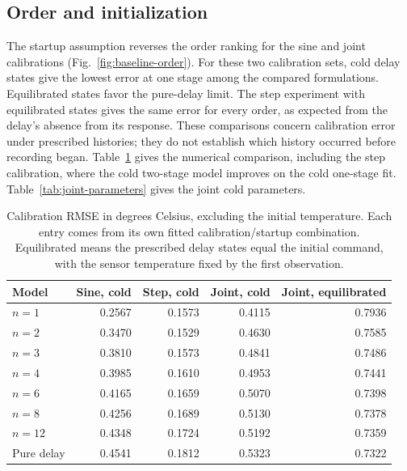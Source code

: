 \documentclass[11pt]{article}
\begin{document}
\subsection{Order and initialization}
The startup assumption reverses the order ranking for the sine and joint
calibrations (Fig.~\ref{fig:baseline-order}). For these two calibration sets,
cold delay states give the lowest error at one stage among the compared
formulations. Equilibrated states favor
the pure-delay limit. The step experiment with equilibrated states gives the
same error for every order, as expected from the delay's absence from its
response. These comparisons concern calibration error under prescribed histories;
they do not establish which history occurred before recording began.
Table~\ref{tab:calibration-rmse} gives the numerical comparison, including the
step calibration, where the cold two-stage model improves on the cold one-stage
fit. Table~\ref{tab:joint-parameters} gives the joint cold parameters.

\begin{table}[tbp]
\centering
\small
\begin{tabular}{lrrrr}
\toprule
Model & Sine, cold & Step, cold & Joint, cold & Joint, equilibrated \\
\midrule
$n=1$ & 0.2567 & 0.1573 & 0.4115 & 0.7936 \\
$n=2$ & 0.3470 & 0.1529 & 0.4630 & 0.7585 \\
$n=3$ & 0.3810 & 0.1573 & 0.4841 & 0.7486 \\
$n=4$ & 0.3985 & 0.1610 & 0.4953 & 0.7441 \\
$n=6$ & 0.4165 & 0.1659 & 0.5070 & 0.7398 \\
$n=8$ & 0.4256 & 0.1689 & 0.5130 & 0.7378 \\
$n=12$ & 0.4348 & 0.1724 & 0.5192 & 0.7359 \\
Pure delay & 0.4541 & 0.1812 & 0.5323 & 0.7322 \\
\bottomrule
\end{tabular}
\caption{Calibration RMSE in degrees Celsius, excluding the initial temperature. Each entry comes from its own fitted calibration/startup combination. Equilibrated means the prescribed delay states equal the initial command, with the sensor temperature fixed by the first observation.}
\label{tab:calibration-rmse}
\end{table}

\end{document}
